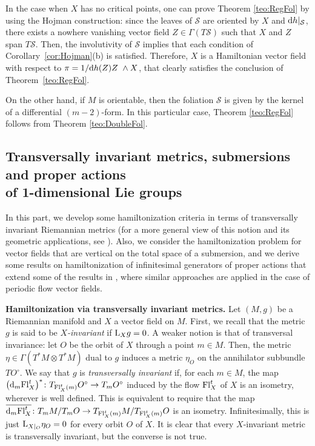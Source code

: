 \documentclass[pdftex]{sigma}%
\newcommand{\dd}{{\rm d}}
\numberwithin{equation}{section}
\begin{document}
In the case when $X$ has no critical points, one can prove Theorem \ref{teo:RegFol} by using the Hojman construction: since the leaves of $\mathcal{S}$ are oriented by $X$ and ${\rm d}h|_{\mathcal{S}}$, there exists a nowhere vanishing vector field $Z\in\Gamma(T\mathcal{S})$ such that $X$ and $Z$ span $T\mathcal{S}$. Then, the involutivity of $\mathcal{S}$ implies that each condition of Corollary~\ref{cor:Hojman}(b) is satisfied. Therefore, $X$ is a Hamiltonian vector field with respect to $\pi = {1}/{\dd{h}(Z)}Z\ \wedge X$, that clearly satisfies the conclusion of Theorem~\ref{teo:RegFol}.

On the other hand, if $M$ is orientable, then the foliation $\mathcal{S}$ is given by the kernel of a differential $(m-2)$-form.
In this particular case, Theorem \ref{teo:RegFol} follows from Theorem \ref{teo:DoubleFol}.


 \subsection[Transversally invariant metrics, submersions and proper actions of 1-dimensional Lie groups]
 {Transversally invariant metrics, submersions and proper actions \\of 1-dimensional Lie groups}\label{subsec:Metric}

In this part, we develop some hamiltonization criteria in terms of transversally invariant Riemannian metrics (for a more general view of this notion and its geometric applications, see \cite{del_Hoyo_2018, PPT-2014}). Also, we consider the hamiltonization problem for vector fields that are vertical on the total space of a submersion, and we derive some results on hamiltonization of infinitesimal generators of proper actions that extend some of the results in \cite{FGS-05}, where similar approaches are applied in the case of periodic flow vector fields.

{\bf Hamiltonization via transversally invariant metrics.} Let $(M,g)$ be a Riemannian manifold and $X$ a vector field on $M$. First, we recall that the metric $g$ is said to be \emph{$X$-invariant} if ${\rm L}_{X}g = 0$. A weaker notion is that of transversal invariance: let $O$ be the orbit of $X$ through a point $m \in M$. Then, the metric $\eta \in \Gamma(T^{*}M \otimes T^{*}M)$ dual to $g$ induces a metric $\eta_{O}$ on the annihilator subbundle $TO^{\circ}$. We say that $g$ is \emph{transversally invariant} if, for each $m \in M$, the map $\big(\dd_{m}{\rm Fl}^{t}_{X}\big)^{*}\colon T_{{\rm Fl}^{t}_{X}(m)}O^{\circ}\to T_{m}O^{\circ}$ induced by the flow ${\rm Fl}^{t}_{X}$ of $X$ is an isometry, wherever is well defined. This is equivalent to require that the map $\overline{\dd_{m}{\rm Fl}^{t}_{X}}\colon T_{m}M / T_{m}O \to T_{{\rm Fl}^{t}_{X}(m)}M / T_{{\rm Fl}^{t}_{X}(m)}O$ is an isometry. Infinitesimally, this is just ${\rm L}_{X|_{O}}\eta_{O} = 0$ for every orbit $O$ of $X$. It is clear that every $X$-invariant metric is transversally invariant, but the converse is not true.
\end{document}
